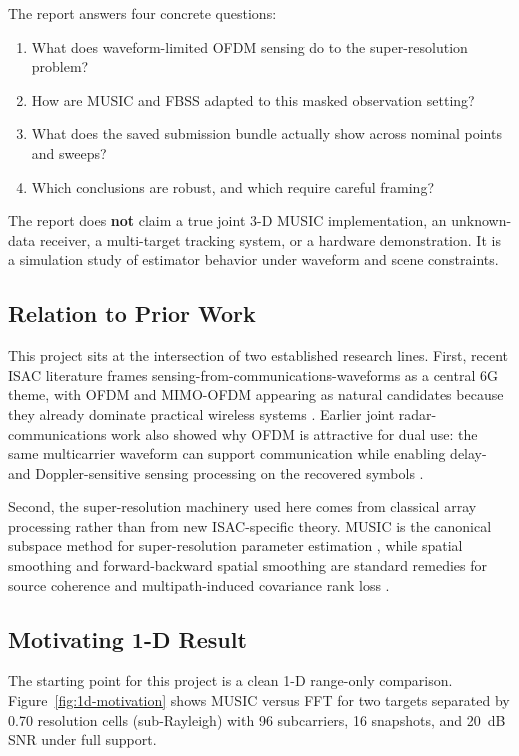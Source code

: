 \documentclass[11pt]{article}
\begin{document}
The report answers four concrete questions:
\begin{enumerate}
  \item What does waveform-limited OFDM sensing do to the super-resolution problem?
  \item How are MUSIC and FBSS adapted to this masked observation setting?
  \item What does the saved submission bundle actually show across nominal points and sweeps?
  \item Which conclusions are robust, and which require careful framing?
\end{enumerate}

The report does \textbf{not} claim a true joint 3-D MUSIC implementation, an unknown-data receiver, a multi-target tracking system, or a hardware demonstration. It is a simulation study of estimator behavior under waveform and scene constraints.

\subsection{Relation to Prior Work}

This project sits at the intersection of two established research lines. First, recent ISAC literature frames sensing-from-communications-waveforms as a central 6G theme, with OFDM and MIMO-OFDM appearing as natural candidates because they already dominate practical wireless systems \cite{liu2022}. Earlier joint radar-communications work also showed why OFDM is attractive for dual use: the same multicarrier waveform can support communication while enabling delay- and Doppler-sensitive sensing processing on the recovered symbols \cite{sturm2009,sit2011}.

Second, the super-resolution machinery used here comes from classical array processing rather than from new ISAC-specific theory. MUSIC is the canonical subspace method for super-resolution parameter estimation \cite{schmidt1986}, while spatial smoothing and forward-backward spatial smoothing are standard remedies for source coherence and multipath-induced covariance rank loss \cite{shan1985,pillai1989}.

\subsection{Motivating 1-D Result}

The starting point for this project is a clean 1-D range-only comparison. Figure~\ref{fig:1d-motivation} shows MUSIC versus FFT for two targets separated by 0.70 resolution cells (sub-Rayleigh) with 96 subcarriers, 16 snapshots, and 20~dB SNR under full support.
\end{document}
